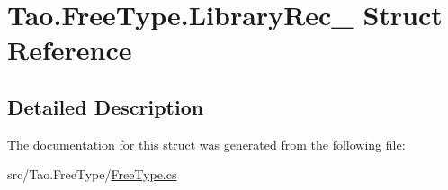 \hypertarget{struct_tao_1_1_free_type_1_1_library_rec__}{
\section{Tao.FreeType.LibraryRec\_\- Struct Reference}
\label{struct_tao_1_1_free_type_1_1_library_rec__}
}


\subsection{Detailed Description}


The documentation for this struct was generated from the following file:\begin{DoxyCompactItemize}
\item 
src/Tao.FreeType/\hyperlink{_free_type_8cs}{FreeType.cs}\end{DoxyCompactItemize}
